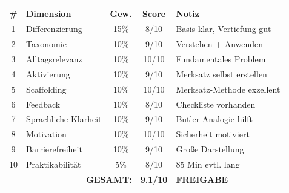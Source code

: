 \documentclass[11pt,a4paper]{article}
\begin{document}
\begin{scorebox}
\begin{tabular}{|c|l|c|c|p{3.5cm}|}
\hline
\# & Dimension & Gew. & Score & Notiz \\
\hline
1 & Differenzierung & 15\% & 8/10 & Basis klar, Vertiefung gut \\
2 & Taxonomie & 10\% & 9/10 & Verstehen + Anwenden \\
3 & Alltagsrelevanz & 10\% & 10/10 & Fundamentales Problem \\
4 & Aktivierung & 10\% & 9/10 & Merksatz selbst erstellen \\
5 & Scaffolding & 10\% & 10/10 & Merksatz-Methode exzellent \\
6 & Feedback & 10\% & 8/10 & Checkliste vorhanden \\
7 & Sprachliche Klarheit & 10\% & 9/10 & Butler-Analogie hilft \\
8 & Motivation & 10\% & 10/10 & Sicherheit motiviert \\
9 & Barrierefreiheit & 10\% & 9/10 & Große Darstellung \\
10 & Praktikabilität & 5\% & 8/10 & 85 Min evtl. lang \\
\hline
\multicolumn{3}{|r|}{\textbf{GESAMT:}} & \textbf{9.1/10} & \textcolor{successgreen}{\textbf{FREIGABE}} \\
\hline
\end{tabular}
\end{scorebox}
\end{document}
